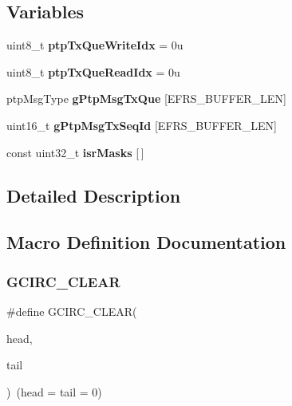 \subsection*{Variables}
\begin{DoxyCompactItemize}
\item 
\mbox{\label{group__gmacd__defines_ga74916b8b8b9489860a7ca46c44614214}} 
uint8\+\_\+t {\bfseries ptp\+Tx\+Que\+Write\+Idx} = 0u
\item 
\mbox{\label{group__gmacd__defines_ga149932a9a4af16ae2048695b064a9379}} 
uint8\+\_\+t {\bfseries ptp\+Tx\+Que\+Read\+Idx} = 0u
\item 
\mbox{\label{group__gmacd__defines_ga8b0a291846fd88795fa72cfce47e83ca}} 
ptp\+Msg\+Type {\bfseries g\+Ptp\+Msg\+Tx\+Que} \mbox{[}E\+F\+R\+S\+\_\+\+B\+U\+F\+F\+E\+R\+\_\+\+L\+EN\mbox{]}
\item 
\mbox{\label{group__gmacd__defines_ga09d34874a2e0dc576ac30251922acbda}} 
uint16\+\_\+t {\bfseries g\+Ptp\+Msg\+Tx\+Seq\+Id} \mbox{[}E\+F\+R\+S\+\_\+\+B\+U\+F\+F\+E\+R\+\_\+\+L\+EN\mbox{]}
\item 
const uint32\+\_\+t {\bfseries isr\+Masks} \mbox{[}$\,$\mbox{]}
\end{DoxyCompactItemize}


\subsection{Detailed Description}


\subsection{Macro Definition Documentation}
\mbox{\label{group__gmacd__defines_ga65fb546208f7516e381b6535c899979a}} 
\subsubsection{\texorpdfstring{GCIRC\_CLEAR}{GCIRC\_CLEAR}}
{\footnotesize\ttfamily \#define G\+C\+I\+R\+C\+\_\+\+C\+L\+E\+AR(\begin{DoxyParamCaption}\item[{}]{head,  }\item[{}]{tail }\end{DoxyParamCaption})~(head = tail = 0)}

